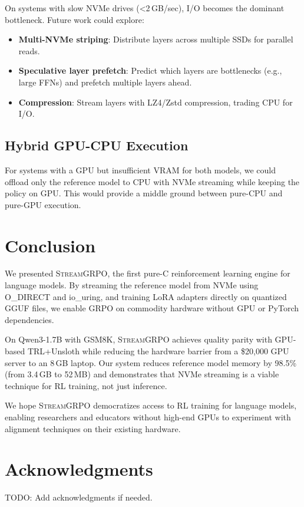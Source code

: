 \documentclass[sigconf,review,anonymous]{acmart}
\begin{document}
On systems with slow NVMe drives (<2\,GB/sec), I/O becomes the dominant bottleneck. Future work could explore:
\begin{itemize}
\item \textbf{Multi-NVMe striping}: Distribute layers across multiple SSDs for parallel reads.
\item \textbf{Speculative layer prefetch}: Predict which layers are bottlenecks (e.g., large FFNs) and prefetch multiple layers ahead.
\item \textbf{Compression}: Stream layers with LZ4/Zstd compression, trading CPU for I/O.
\end{itemize}

\subsection{Hybrid GPU-CPU Execution}

For systems with a GPU but insufficient VRAM for both models, we could offload only the reference model to CPU with NVMe streaming while keeping the policy on GPU. This would provide a middle ground between pure-CPU and pure-GPU execution.

\section{Conclusion}

We presented \textsc{StreamGRPO}, the first pure-C reinforcement learning engine for language models. By streaming the reference model from NVMe using O\_DIRECT and io\_uring, and training LoRA adapters directly on quantized GGUF files, we enable GRPO on commodity hardware without GPU or PyTorch dependencies.

On Qwen3-1.7B with GSM8K, \textsc{StreamGRPO} achieves quality parity with GPU-based TRL+Unsloth while reducing the hardware barrier from a \$20,000 GPU server to an 8\,GB laptop. Our system reduces reference model memory by 98.5\% (from 3.4\,GB to 52\,MB) and demonstrates that NVMe streaming is a viable technique for RL training, not just inference.

We hope \textsc{StreamGRPO} democratizes access to RL training for language models, enabling researchers and educators without high-end GPUs to experiment with alignment techniques on their existing hardware.

\section*{Acknowledgments}

TODO: Add acknowledgments if needed.



\end{document}
